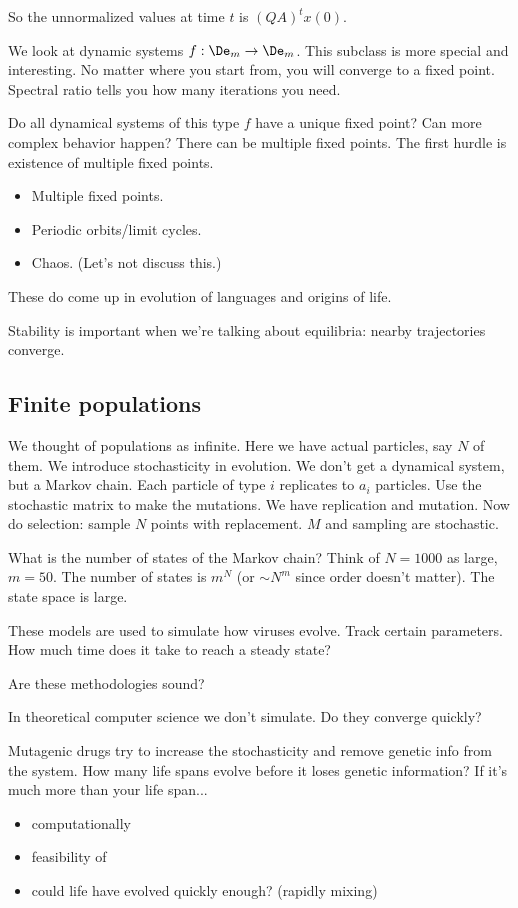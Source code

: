 So the unnormalized values at time $t$ is $(QA)^tx(0)$.

We look at dynamic systems $f:\De_m\to \De_m$. This subclass is more special and interesting. No matter where you start from, you will converge to a fixed point. Spectral ratio tells you how many iterations you need.

Do all dynamical systems of this type $f$ have a unique fixed point? Can more complex behavior happen?
There can be multiple fixed points. The first hurdle is existence of multiple fixed points. 
\begin{itemize}
\item
Multiple fixed points.
\item Periodic orbits/limit cycles.
\item
Chaos. (Let's not discuss this.)
\end{itemize}
These do come up in evolution of languages and origins of life.

Stability is important when we're talking about equilibria: nearby trajectories converge.

\subsection{Finite populations}

We thought of populations as infinite. Here we have actual particles, say $N$ of them. We introduce stochasticity in evolution. We don't get a dynamical system, but a Markov chain. Each particle of type $i$ replicates to $a_i$ particles. Use the stochastic matrix to make the mutations. 
We have replication and mutation. Now do selection: sample $N$ points with replacement. $M$ and sampling are stochastic.

What is the number of states of the Markov chain?
Think of $N=1000$ as large, $m=50$. The number of states is $m^N$ (or $\sim N^m$ since order doesn't matter). The state space is large.

These models are used to simulate how viruses evolve. 
Track certain parameters. How much time does it take to reach a steady state?

Are these methodologies sound?

In theoretical computer science we don't simulate. Do they converge quickly?

Mutagenic drugs try to increase the stochasticity and remove genetic info from the system. How many life spans evolve before it loses genetic information? If it's much more than your life span...
\begin{itemize}
\item
computationally
\item
feasibility of %
\item
could life have evolved quickly enough? (rapidly mixing) %
\end{itemize}


